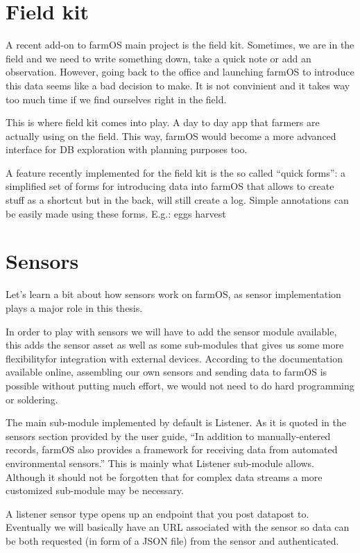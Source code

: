 \section{Field kit}
A recent add-on to farmOS main project is the field kit. Sometimes, we are in the field and we need to write something down, take a quick note or add an observation. However, going back to the office and launching farmOS to introduce this data seems like a bad decision to make. It is not convinient and it takes way too much time if we find ourselves right in the field. 

This is where field kit comes into play. A day to day app that farmers are actually using on the field. This way, farmOS would become a more advanced interface for DB exploration with planning purposes too.

A feature recently implemented for the field kit is the so called ``quick forms'': a simplified set of forms for introducing data into farmOS that allows to create stuff as a shortcut but in the back, will still create a log. Simple annotations can be easily made using these forms. E.g.: eggs harvest

\section{Sensors}
Let's learn a bit about how sensors work on farmOS, as sensor implementation plays a major role in this thesis.

In order to play with sensors we will have to add the sensor module available, this adds the sensor asset as well as some sub-modules that gives us some more flexibilityfor integration with external devices. According to the documentation available online, assembling our own sensors and sending data to farmOS is possible without putting much effort, we would not need to do hard programming or soldering.

The main sub-module implemented by default is Listener. As it is quoted in the sensors section provided by the user guide, ``In addition to manually-entered records, farmOS also provides a framework for receiving data from automated environmental sensors.'' This is mainly what Listener sub-module allows. Although it should not be forgotten that for complex data streams a more customized sub-module may be necessary.

A listener sensor type opens up an endpoint that you post datapost to. Eventually we will basically have an URL associated with the sensor so data can be both requested (in form of a JSON file) from the sensor and authenticated.

